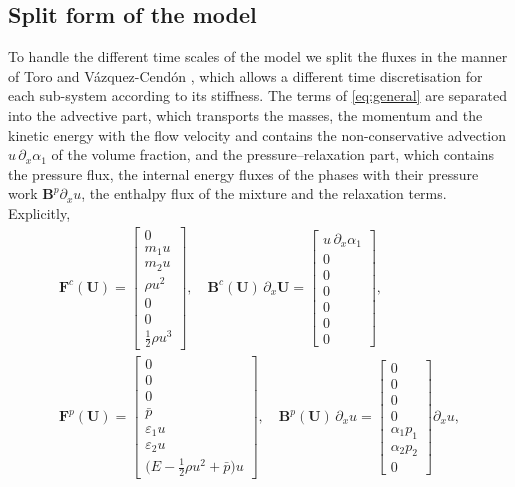 \documentclass[a4paper,fleqn]{cas-sc}
\begin{document}
\subsection{Split form of the model}
\label{sec:split}
To handle the different time scales of the model we split the fluxes in the manner of Toro and V\'azquez-Cend\'on
\cite{ToroVazquez2012}, which allows a different time discretisation for each sub-system according to its stiffness. The terms
of \eqref{eq:general} are separated into the advective part, which transports the masses, the momentum and the kinetic
energy with the flow velocity and contains the non-conservative advection $u\,\partial_x\alpha_1$ of the volume fraction, and the
pressure--relaxation part, which contains the pressure flux, the internal energy fluxes of the phases with their pressure work
$\mathbf B^p\partial_xu$, the enthalpy flux of the mixture and the relaxation terms. Explicitly,
\begin{equation}
\begin{gathered}
\mathbf F^c(\mathbf U)=\begin{bmatrix}0\\ m_1u\\ m_2u\\ \rho u^2\\ 0\\ 0\\ \tfrac12\rho u^3\end{bmatrix},\quad
\mathbf B^c(\mathbf U)\,\partial_x\mathbf U=\begin{bmatrix}u\,\partial_x\alpha_1\\0\\0\\0\\0\\0\\0\end{bmatrix},\\
\mathbf F^p(\mathbf U)=\begin{bmatrix}0\\0\\0\\ \bar p\\ \varepsilon_1u\\ \varepsilon_2u\\ \big(E-\tfrac12\rho u^2+\bar p\big)u\end{bmatrix},\quad
\mathbf B^p(\mathbf U)\,\partial_xu=\begin{bmatrix}0\\0\\0\\0\\ \alpha_1p_1\\ \alpha_2p_2\\0\end{bmatrix}\partial_xu ,
\end{gathered}
\label{eq:split_fluxes}
\end{equation}
\end{document}

